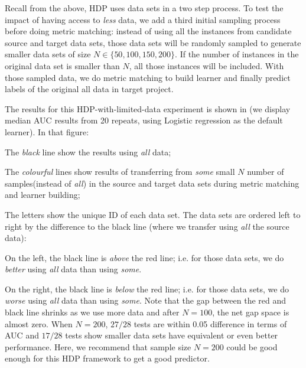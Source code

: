 Recall from the above,
HDP uses  data sets  in a two step process.
To test the impact of having access to {\em less} data,
we  add a third initial sampling process before doing metric matching:
instead of using all the instances from
candidate source and target data sets, those data sets will
be randomly sampled to generate smaller data sets of
size $N \in \{50, 100, 150, 200\}$. If
the number of instances in the original data set is
smaller than $N$, all those instances will be
included. With those sampled data, we do metric matching to build learner
and finally predict labels of the original all data in target project.

The results for this HDP-with-limited-data experiment is shown in 
(we display median AUC results from 20 repeats, using  Logistic regression
as the default learner). 
In that figure:
\bi
\item
  The {\em black} line show the results using {\em all} data;
\item
  The {\em colourful} lines show results of transferring from {\em some} small $N$ number of samples(instead of {\em all})
  in the source and target data sets during metric matching and learner building;
\item
  The letters show the unique ID of each data set.
\ei
The data sets are ordered left to right by the difference to the black line (where we transfer using {\em
  all} the source data):
\bi
\item
  On the left, the black line is
  {\em above} the red line; i.e. for those data sets, we do {\em better} using
  {\em all} data than using {\em some}.
  \item
On the right, the black line is {\em below} the red
line; i.e. for those data sets, we do {\em worse}
using {\em all} data than using {\em some}.  \ei
Note that the gap between the red and black line
shrinks as we use more data and after $N=100$, the
net gap space is almost zero.  When $N=200$, $27/28$
tests are within 0.05 difference in terms of AUC and
$17/28$ tests show smaller data sets have equivalent
or even better performance. Here, we recommend that
sample size $N=200$ could be good enough for this
HDP framework to get a good predictor.



